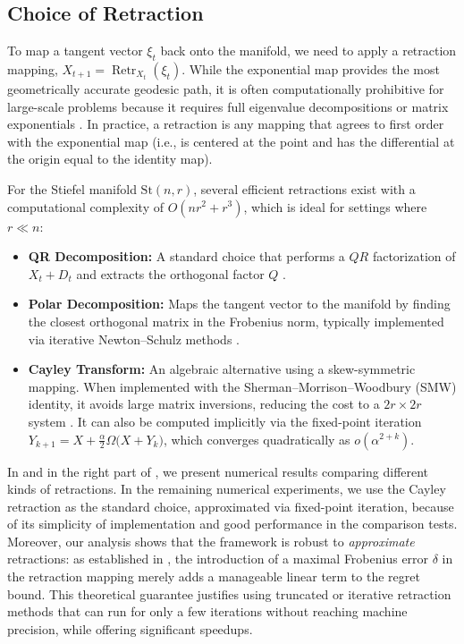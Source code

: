 \documentclass[11pt,a4paper]{article}
\numberwithin{equation}{section}
\let\Omega\varOmega
\newcommand{\Stnr}{\mathrm{St}(n,r)}    %
\theoremstyle{plain}
\theoremstyle{definition}
\theoremstyle{remark}
\DeclareMathOperator{\Retraction}{Retr}
\begin{document}
\subsection{Choice of Retraction}\label{sec:retractions}

To map a tangent vector $\xi_{t}$ back onto the manifold, we need to apply a retraction mapping, $X_{t+1} = \Retraction_{X_{t}}(\xi_{t})$.
While the exponential map provides the most geometrically accurate geodesic path, it is often computationally prohibitive for large-scale problems because it requires full eigenvalue decompositions or matrix exponentials \citep{AMS:2008}. In practice, a retraction is any mapping that agrees to first order with the exponential map (i.e., is centered at the point and has the differential at the origin equal to the identity map). 

For the Stiefel manifold $\Stnr$, several efficient retractions exist with a computational complexity of $O(nr^2 + r^3)$, which is ideal for settings where $r \ll n$:
\begin{itemize}
    \item \textbf{QR Decomposition:} A standard choice that performs a $QR$ factorization of $X_t + D_t$ and extracts the orthogonal factor $Q$ \citep[(4.8)]{AMS:2008}.
    \item \textbf{Polar Decomposition:} Maps the tangent vector to the manifold by finding the closest orthogonal matrix in the Frobenius norm, typically implemented via iterative Newton--Schulz methods \citep{ZhuSato2020}.
    \item \textbf{Cayley Transform:} An algebraic alternative using a skew-symmetric mapping. When implemented with the Sherman--Morrison--Woodbury (SMW) identity, it avoids large matrix inversions, reducing the cost to a $2r \times 2r$ system \citep[\S 2.2]{WenYin2013}. It can also be computed implicitly via the fixed-point iteration $ Y_{k+1} = X + \frac{\alpha}{2} \Omega \bigl( X + Y_k \bigr) $, which converges quadratically as $o(\alpha^{2+k})$.
\end{itemize}

In  and in the right part of , we present numerical results comparing different kinds of retractions. In the remaining numerical experiments, we use the Cayley retraction as the standard choice, approximated via fixed-point iteration, because of its simplicity of implementation and good performance in the comparison tests. Moreover, our analysis shows that the framework is robust to \textit{approximate} retractions: as established in , the introduction of a maximal Frobenius error $\delta$ in the retraction mapping merely adds a manageable linear term to the regret bound. This theoretical guarantee justifies using truncated or iterative retraction methods that can run for only a few iterations without reaching machine precision, while offering significant speedups. 
\end{document}
